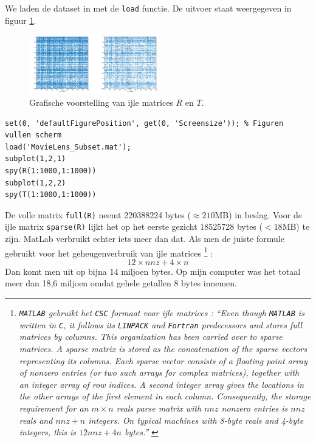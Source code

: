 


We laden de dataset in met de \texttt{load} functie. De uitvoer staat weergegeven in figuur \ref{fig:op1}.

\vspace{0.3cm}
\begin{figure}[h]
\centering
\includegraphics[width=0.5\textwidth]{res/op1.png}
\caption{Grafische voorstelling van ijle matrices $R$ en $T$.}
\label{fig:op1}
\end{figure}

\begin{lstlisting}
set(0, 'defaultFigurePosition', get(0, 'Screensize')); % Figuren vullen scherm
load('MovieLens_Subset.mat');
subplot(1,2,1)
spy(R(1:1000,1:1000))
subplot(1,2,2)
spy(T(1:1000,1:1000))
\end{lstlisting}



De volle matrix \texttt{full(R)} neemt 220388224 bytes ($\approx 210$MB) in beslag. Voor de ijle matrix \texttt{sparse(R)} lijkt het op het eerste gezicht 18525728 bytes ($< 18$MB) te zijn. MatLab verbruikt echter iets meer dan dat. Als men de juiste formule gebruikt voor het geheugenverbruik van ijle matrices \footnote{\textit{\texttt{MATLAB} gebruikt het \texttt{CSC} formaat voor ijle matrices : ``Even though \texttt{MATLAB} is written in \texttt{C}, it follows its \texttt{LINPACK} and \texttt{Fortran} predecessors and stores full matrices by columns. This organization has been carried over to sparse matrices. A sparse matrix is stored as the concatenation of the sparse vectors representing its columns. Each sparse vector consists of a floating point array of nonzero entries (or two such arrays for complex matrices), together with an integer array of row indices. A second integer array gives the locations in the other arrays of the first element in each column. Consequently, the storage requirement for an $m\times n$ reals parse matrix with $nnz$ nonzero entries is $nnz$ reals and $nnz+n$ integers. On typical machines with 8-byte reals and 4-byte integers, this is $12nnz+4n$ bytes.''} \cite{Gilbert1992}} :
$$12\times nnz+4\times n$$
Dan komt men uit op bijna 14 miljoen bytes. Op mijn computer was het totaal meer dan 18,6 miljoen omdat gehele getallen 8 bytes innemen.

